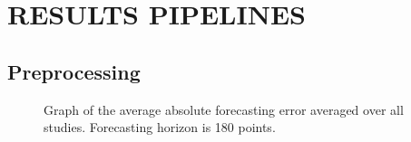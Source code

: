 \section{RESULTS PIPELINES}
\label{RESULTS PIPELINES}

\subsection{Preprocessing}
\begin{figure}[!h]
	\caption{Graph of the average absolute forecasting error averaged over all studies. Forecasting horizon is 180 points.}
	\label{ris:errors}
\end{figure}